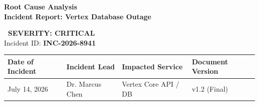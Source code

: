 \documentclass[11pt,a4paper]{article}
\begin{document}
\noindent
\begin{minipage}[t]{0.62\textwidth}
  \vspace{0pt}
  {\Huge\bfseries\color{PrimaryColor} Root Cause Analysis} \\
  {\large\bfseries\color{SecondaryColor} Incident Report: Vertex Database Outage}
\end{minipage}%
\hfill
\begin{minipage}[t]{0.35\textwidth}
  \vspace{0pt}
  \raggedleft
  \begin{tcolorbox}[colback=WarningColor!10, colframe=WarningColor, arc=4pt, width=\textwidth, boxrule=1.5pt, halign=center, valign=center, top=6pt, bottom=6pt]
    \textcolor{WarningColor}{\textbf{\large\faExclamationTriangle~SEVERITY: CRITICAL}} \\
    \vspace{1pt}
    \textcolor{PrimaryColor}{\small Incident ID: \textbf{INC-2026-8941}}
  \end{tcolorbox}
\end{minipage}

\vspace{0.3cm}

\noindent
\begin{tabularx}{\textwidth}{@{} X X X X @{}}
  \toprule
  \textbf{\small Date of Incident} & \textbf{\small Incident Lead} & \textbf{\small Impacted Service} & \textbf{\small Document Version} \\
  \midrule
  July 14, 2026 & Dr. Marcus Chen & Vertex Core API / DB & v1.2 (Final) \\
  \bottomrule
\end{tabularx}

\vspace{0.4cm}









\end{document}
